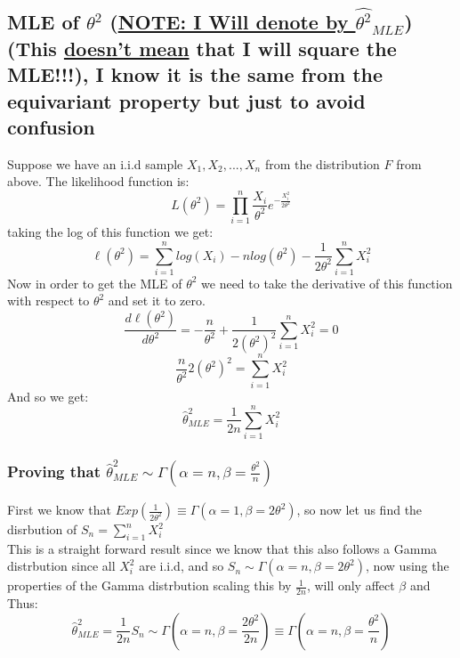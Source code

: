 \documentclass[12pt]{article}
\begin{document}
\subsection*{MLE of $\theta^2$ (\underline{NOTE: I Will denote by $\hat{\theta^2}_{MLE}$})(This \underline{doesn't mean} that I will square the MLE!!!), I know it is the same from the equivariant property but just to avoid confusion}
Suppose we have an i.i.d sample $X_1, X_2, ..., X_n$ from the distribution $F$ from above. The likelihood function is:
\[
  L(\theta^2) = \prod_{i=1}^{n} \frac{X_i}{\theta^2}e^{-\frac{X_i^2}{2\theta^2}}
\]
taking the log of this function we get:
\[
  \ell(\theta^2) = \sum_{i=1}^{n} log(X_i) - n log(\theta^2) - \frac{1}{2\theta^2} \sum_{i=1}^{n} X_i^2
\]
Now in order to get the MLE of $\theta^2$ we need to take the derivative of this function with respect to $\theta^2$ and set it to zero.
\[
  \frac{d\ell(\theta^2)}{d\theta^2} = -\frac{n}{\theta^2} + \frac{1}{2(\theta^2)^2} \sum_{i=1}^{n} X_i^2 = 0
\]
\[
  \frac{n}{\theta^2} 2(\theta^2)^2 = \sum_{i=1}^{n} X_i^2
\]
And so we get:
\[
  \hat{\theta}^2_{MLE} = \frac{1}{2n} \sum_{i=1}^{n} X_i^2
\]
\subsubsection*{Proving that $\hat{\theta}^2_{MLE} \sim \Gamma(\alpha=n, \beta = \frac{\theta^2}{n})$}
First we know that $Exp(\frac{1}{2\theta^2}) \equiv \Gamma(\alpha=1,\beta = 2\theta^2)$, so now let us find the disrbution of $S_n = \sum_{i=1}^{n}X_i^2$\\
This is a straight forward result since we know that this also follows a Gamma distrbution since all $X_i^2$ are i.i.d, and so $S_n \sim \Gamma(\alpha=n,\beta = 2\theta^2)$, now using the properties of the Gamma distrbution scaling this by $\frac{1}{2n}$, will only affect $\beta$ and Thus:
\[
  \hat{\theta}^2_{MLE} = \frac{1}{2n} S_n \sim \Gamma(\alpha=n,\beta=\frac{2\theta^2}{2n}) \equiv \Gamma(\alpha=n, \beta = \frac{\theta^2}{n})
\]
\end{document}

